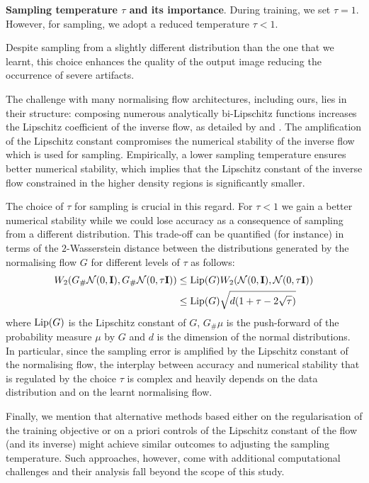 \textbf{Sampling temperature $\tau$ and its importance}. During training, we set \( \tau = 1 \). However, for sampling, we adopt a reduced temperature \( \tau <1 \).

Despite sampling from a slightly different distribution than the one that we learnt, this choice enhances the quality of the output image reducing the occurrence of severe artifacts.

The challenge with many normalising flow architectures, including ours, lies in their structure: composing numerous analytically bi-Lipschitz functions increases the Lipschitz coefficient of the inverse flow, as detailed by \cite{behrmann2021understanding} and \cite{verine2023expressivity}. The amplification of the Lipschitz constant compromises the numerical stability of the inverse flow which is used for sampling.
Empirically, a lower sampling temperature ensures better numerical stability, which implies that the Lipschitz constant of the inverse flow constrained in the higher density regions is significantly smaller. 

The choice of $\tau$ for sampling is crucial in this regard. For $\tau < 1$ we gain a better numerical stability while we could lose accuracy as a consequence of sampling from a different distribution. This trade-off can be quantified (for instance) in terms of the $2$-Wasserstein distance between the distributions generated by the normalising flow $G$ for different levels of $\tau$ as follows: 
\begin{align*}
    W_2(G_\# \mathcal{N}(0,\textbf{I}), G_\# \mathcal{N}(0,\tau \textbf{I})) & \leq {\rm Lip}(G) W_2(\mathcal{N}(0,\textbf{I}), \mathcal{N}(0,\tau \textbf{I})) \\
    & \leq {\rm Lip}(G) \sqrt{d(1 + \tau - 2\sqrt{\tau})}
 \end{align*}
where ${\rm Lip}(G)$ is the Lipschitz constant of $G$, $G_\# \mu$ is the push-forward of the probability measure $\mu$ by $G$ and $d$ is the dimension of the normal distributions. In particular, since the sampling error is amplified by the Lipschitz constant of the normalising flow, the interplay between accuracy and numerical stability that is regulated by the choice $\tau$ is complex and heavily depends on the data distribution and on the learnt normalising flow.  

Finally, we mention that alternative methods based either on the regularisation of the training objective \cite{onken2021ot} or on a priori controls of the Lipschitz constant of the flow (and its inverse) \cite{verine2023expressivity} might achieve similar outcomes to adjusting the sampling temperature. Such approaches, however, come with additional computational challenges and their analysis fall beyond the scope of this study.

